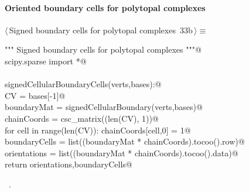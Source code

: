 \documentclass[11pt,oneside]{article}    %
\begin{document}

\paragraph{Oriented boundary cells for polytopal complexes}

\begin{flushleft} \small \label{scrap54}
\protect{}$\langle\,$Signed boundary cells for polytopal complexes\nobreak\ {\footnotesize 33b}$\,\rangle\equiv$
\vspace{-1ex}
\begin{list}{}{} \item
\mbox{}\verb@""" Signed boundary cells for polytopal complexes """@\\
\mbox{}\verb@from scipy.sparse import *@\\
\mbox{}\verb@@\\
\mbox{}\verb@def signedCellularBoundaryCells(verts,bases):@\\
\mbox{}\verb@    CV = bases[-1]@\\
\mbox{}\verb@    boundaryMat = signedCellularBoundary(verts,bases)@\\
\mbox{}\verb@    chainCoords = csc_matrix((len(CV), 1))@\\
\mbox{}\verb@    for cell in range(len(CV)): chainCoords[cell,0] = 1@\\
\mbox{}\verb@    boundaryCells = list((boundaryMat * chainCoords).tocoo().row)@\\
\mbox{}\verb@    orientations = list((boundaryMat * chainCoords).tocoo().data)@\\
\mbox{}\verb@    return orientations,boundaryCells@\\
\mbox{}\verb@@{\NWsep}
\end{list}
\vspace{-1ex}
\footnotesize\addtolength{\baselineskip}{-1ex}
\begin{list}{}{\setlength{\itemsep}{-\parsep}\setlength{\itemindent}{-\leftmargin}}
\item \NWtxtMacroRefIn\ .
\end{list}
\end{flushleft}
\end{document}
